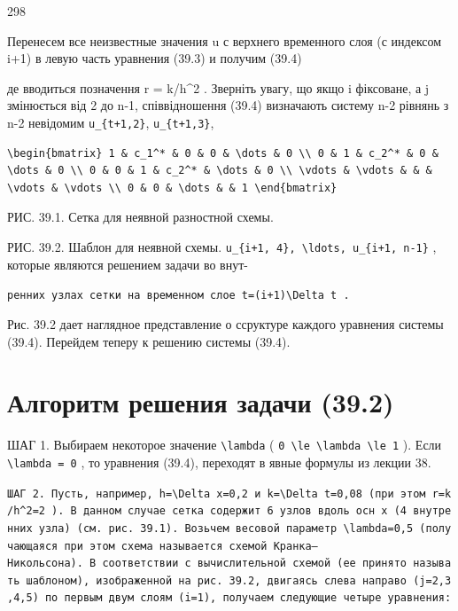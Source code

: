 \documentclass[
  ukrainian,
]{article}
\begin{document}
298

Перенесем все неизвестные значения u с верхнего временного слоя (с
индексом i+1) в левую часть уравнения (39.3) и получим (39.4)

де вводиться позначення r = k/h\^{}2 . Зверніть увагу, що якщо i
фіксоване, а j змінюється від 2 до n-1, співвідношення (39.4) визначають
систему n-2 рівнянь з n-2 невідомим \texttt{u\_\{t+1,2\}},
\texttt{u\_\{t+1,3\}},

\begin{verbatim}
\begin{bmatrix} 1 & c_1^* & 0 & 0 & \dots & 0 \\ 0 & 1 & c_2^* & 0 & \dots & 0 \\ 0 & 0 & 1 & c_2^* & \dots & 0 \\ \vdots & \vdots & & & \vdots & \vdots \\ 0 & 0 & \dots & & 1 \end{bmatrix}
\end{verbatim}

РИС. 39.1. Сетка для неявной разностной схемы.

РИС. 39.2. Шаблон для неявной схемы.
\texttt{u\_\{i+1,\ 4\},\ \textbackslash{}ldots,\ u\_\{i+1,\ n-1\}} ,
которые являются решением задачи во внут-

\texttt{ренних\ узлах\ сетки\ на\ временном\ слое\ \textquotesingle{}t=(i+1)\textbackslash{}Delta\ t\textquotesingle{}\ .}

Рис. 39.2 дает наглядное представление о ссруктуре каждого уравнения
системы (39.4). Перейдем теперу к решению системы (39.4).

\section{Алгоритм решения задачи
(39.2)}\label{ux430ux43bux433ux43eux440ux438ux442ux43c-ux440ux435ux448ux435ux43dux438ux44f-ux437ux430ux434ux430ux447ux438-39.2}

ШАГ 1. Выбираем некоторое значение \texttt{\textbackslash{}lambda} (
\texttt{0\ \textbackslash{}le\ \textbackslash{}lambda\ \textbackslash{}le\ 1}
). Если \texttt{\textbackslash{}lambda\ =\ 0} , то уравнения (39.4),
переходят в явные формулы из лекции 38.

\texttt{ШАГ\ 2.\ Пусть,\ например,\ \textquotesingle{}h=\textbackslash{}Delta\ x=0,2\textquotesingle{}\ и\ \textquotesingle{}k=\textbackslash{}Delta\ t=0,08\textquotesingle{}\ (при\ этом\ \textquotesingle{}r=k/h\^{}2=2\textquotesingle{}\ ).\ В\ данном\ случае\ сетка\ содержит\ 6\ узлов\ вдоль\ осн\ x\ (4\ внутренних\ узла)\ (см.\ рис.\ 39.1).\ Возьчем\ весовой\ параметр\ \textquotesingle{}\textbackslash{}lambda=0,5\textquotesingle{}\ (получающаяся\ при\ этом\ схема\ называется\ схемой\ Кранка—Никольсона).\ В\ соответствии\ с\ вычислительной\ схемой\ (ее\ принято\ называть\ шаблоном),\ изображенной\ на\ рис.\ 39.2,\ двигаясь\ слева\ направо\ (j=2,3,4,5)\ по\ первым\ двум\ слоям\ (i=1),\ получаем\ следующие\ четыре\ уравнения:}
\end{document}
